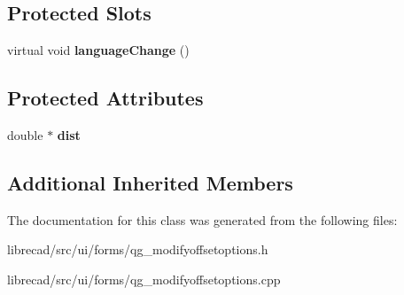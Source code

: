 \subsection*{Protected Slots}
\begin{DoxyCompactItemize}
\item 
\hypertarget{classQG__ModifyOffsetOptions_a9053bde4f893bce3b6f391b0b4a92d6c}{virtual void {\bfseries language\-Change} ()}\label{classQG__ModifyOffsetOptions_a9053bde4f893bce3b6f391b0b4a92d6c}

\end{DoxyCompactItemize}
\subsection*{Protected Attributes}
\begin{DoxyCompactItemize}
\item 
\hypertarget{classQG__ModifyOffsetOptions_a64c95e0c7261c064a9975c73ae4223b8}{double $\ast$ {\bfseries dist}}\label{classQG__ModifyOffsetOptions_a64c95e0c7261c064a9975c73ae4223b8}

\end{DoxyCompactItemize}
\subsection*{Additional Inherited Members}


The documentation for this class was generated from the following files\-:\begin{DoxyCompactItemize}
\item 
librecad/src/ui/forms/qg\-\_\-modifyoffsetoptions.\-h\item 
librecad/src/ui/forms/qg\-\_\-modifyoffsetoptions.\-cpp\end{DoxyCompactItemize}
